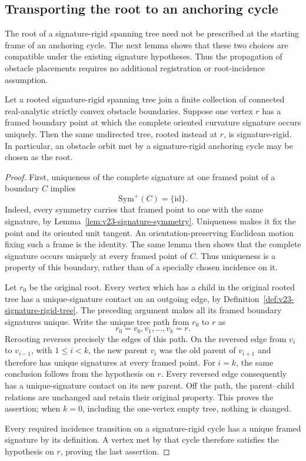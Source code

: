 \subsection{Transporting the root to an anchoring cycle}
\label{subsec:v40-rerooting}

The root of a signature-rigid spanning tree need not be prescribed at the
starting frame of an anchoring cycle.  The next lemma shows that these two
choices are compatible under the existing signature hypotheses.  Thus the
propagation of obstacle placements requires no additional registration or
root-incidence assumption.

\begin{lemma}
\label{lem:v40-signature-rigid-rerooting}
Let a rooted signature-rigid spanning tree join a finite collection of
connected real-analytic strictly convex obstacle boundaries.  Suppose one
vertex $r$ has a framed boundary point at which the complete oriented
curvature signature occurs uniquely.  Then the same undirected tree,
rooted instead at $r$, is signature-rigid.  In particular, an obstacle
orbit met by a signature-rigid anchoring cycle may be chosen as the root.
\end{lemma}

\begin{proof}
First, uniqueness of the complete signature at one framed point of a
boundary $C$ implies
\[
                         \mathrm{Sym}^{+}(C)=\{\mathrm{id}\}.
\]
Indeed, every symmetry carries that framed point to one with the same
signature, by Lemma~\ref{lem:v23-signature-symmetry}.  Uniqueness makes it
fix the point and its oriented unit tangent.  An orientation-preserving
Euclidean motion fixing such a frame is the identity.  The same lemma
then shows that the complete signature occurs uniquely at every framed
point of $C$.  Thus uniqueness is a property of this boundary, rather
than of a specially chosen incidence on it.

Let $r_0$ be the original root.  Every vertex which has a child in the
original rooted tree has a unique-signature contact on an outgoing edge,
by Definition~\ref{def:v23-signature-rigid-tree}.  The preceding argument
makes all its framed boundary signatures unique.  Write the unique tree
path from $r_0$ to $r$ as
\[
                    r_0=v_0,v_1,\ldots,v_k=r.
\]
Rerooting reverses precisely the edges of this path.  On the reversed
edge from $v_i$ to $v_{i-1}$, with $1\le i<k$, the new parent $v_i$ was
the old parent of $v_{i+1}$ and therefore has unique signatures at every
framed point.  For $i=k$, the same conclusion follows from the hypothesis
on $r$.  Every reversed edge consequently has a unique-signature contact
on its new parent.  Off the path, the parent--child relations are
unchanged and retain their original property.  This proves the assertion;
when $k=0$, including the one-vertex empty tree, nothing is changed.

Every required incidence transition on a signature-rigid cycle has a
unique framed signature by its definition.  A vertex met by that cycle
therefore satisfies the hypothesis on $r$, proving the last assertion.
\end{proof}

